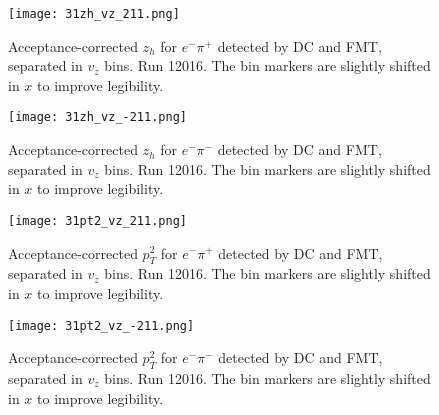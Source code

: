     \begin{figure}
        \centering
        \texttt{[image: 31zh\_vz\_211.png]}
        \caption[Acceptance-corrected $z_h$ for $e^-\pi^+$ separated in $v_z$ bins]
        {Acceptance-corrected $z_h$ for $e^-\pi^+$ detected by DC and FMT, separated in $v_z$ bins.
        Run 12016.
        The bin markers are slightly shifted in $x$ to improve legibility.}
        \label{fig::14.31::zh_211_vz}
    \end{figure}

    \begin{figure}
        \centering
        \texttt{[image: 31zh\_vz\_-211.png]}
        \caption[Acceptance-corrected $z_h$ for $e^-\pi^-$ separated in $v_z$ bins]
        {Acceptance-corrected $z_h$ for $e^-\pi^-$ detected by DC and FMT, separated in $v_z$ bins.
        Run 12016.
        The bin markers are slightly shifted in $x$ to improve legibility.}
        \label{fig::14.31::zh_-211_vz}
    \end{figure}

    \begin{figure}
        \centering
        \texttt{[image: 31pt2\_vz\_211.png]}
        \caption[Acceptance-corrected $p_T^2$ for $e^-\pi^+$ separated in $v_z$ bins]
        {Acceptance-corrected $p_T^2$ for $e^-\pi^+$ detected by DC and FMT, separated in $v_z$ bins.
        Run 12016.
        The bin markers are slightly shifted in $x$ to improve legibility.}
        \label{fig::14.31::pt2_211_vz}
    \end{figure}

    \begin{figure}
        \centering
        \texttt{[image: 31pt2\_vz\_-211.png]}
        \caption[Acceptance-corrected $p_T^2$ for $e^-\pi^-$ separated in $v_z$ bins]
        {Acceptance-corrected $p_T^2$ for $e^-\pi^-$ detected by DC and FMT, separated in $v_z$ bins.
        Run 12016.
        The bin markers are slightly shifted in $x$ to improve legibility.}
        \label{fig::14.31::pt2_-211_vz}
    \end{figure}

